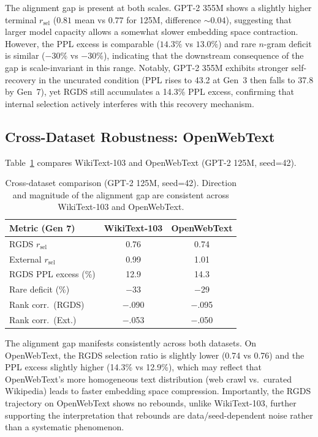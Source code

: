 \documentclass[11pt,a4paper]{article}
\newcommand{\ratio}{\ensuremath{r_{\text{sel}}}}
\begin{document}
The alignment gap is present at both scales.
GPT-2 355M shows a slightly higher terminal $\ratio$ ($0.81$ mean vs $0.77$ for 125M, difference ${\sim}0.04$), suggesting that larger model capacity allows a somewhat slower embedding space contraction.
However, the PPL excess is comparable ($14.3\%$ vs $13.0\%$) and rare $n$-gram deficit is similar ($-30\%$ vs $-30\%$), indicating that the downstream consequence of the gap is scale-invariant in this range.
Notably, GPT-2 355M exhibits stronger self-recovery in the uncurated condition (PPL rises to 43.2 at Gen~3 then falls to 37.8 by Gen~7), yet RGDS still accumulates a 14.3\% PPL excess, confirming that internal selection actively interferes with this recovery mechanism.

\subsection{Cross-Dataset Robustness: OpenWebText}
\label{sec:owt}

Table~\ref{tab:dataset} compares WikiText-103 and OpenWebText (GPT-2 125M, seed=42).

\begin{table}[t]
\centering
\small
\begin{tabular}{lcc}
\toprule
Metric (Gen 7) & WikiText-103 & OpenWebText \\
\midrule
RGDS $\ratio$ & 0.76 & 0.74 \\
External $\ratio$ & 0.99 & 1.01 \\
RGDS PPL excess (\%) & 12.9 & 14.3 \\
Rare deficit (\%) & $-$33 & $-$29 \\
Rank corr.\ (RGDS) & $-$.090 & $-$.095 \\
Rank corr.\ (Ext.) & $-$.053 & $-$.050 \\
\bottomrule
\end{tabular}
\caption{Cross-dataset comparison (GPT-2 125M, seed=42). Direction and magnitude of the alignment gap are consistent across WikiText-103 and OpenWebText.}
\label{tab:dataset}
\end{table}

The alignment gap manifests consistently across both datasets.
On OpenWebText, the RGDS selection ratio is slightly lower (0.74 vs 0.76) and the PPL excess slightly higher (14.3\% vs 12.9\%), which may reflect that OpenWebText's more homogeneous text distribution (web crawl vs.\ curated Wikipedia) leads to faster embedding space compression.
Importantly, the RGDS trajectory on OpenWebText shows no rebounds, unlike WikiText-103, further supporting the interpretation that rebounds are data/seed-dependent noise rather than a systematic phenomenon.
\end{document}
